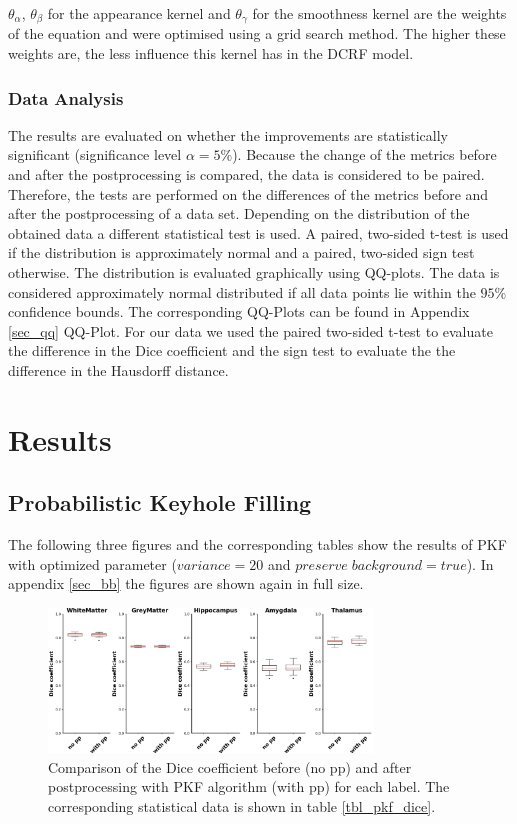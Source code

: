 \documentclass[journal]{IEEEtran}
\begin{document}
$\theta_\alpha$, $\theta_\beta$ for the appearance kernel and $\theta_\gamma$ for the smoothness kernel are the weights of the equation and were optimised using a grid search method. The higher these weights are, the less influence this kernel has in the DCRF model.
\subsubsection{Data Analysis}
The results are evaluated on whether the improvements are statistically significant (significance level $\alpha = 5\%$). Because the change of the metrics before and after the postprocessing is compared, the data is considered to be paired. Therefore, the tests are performed on the differences of the metrics before and after the postprocessing of a data set. Depending on the distribution of the obtained data a different statistical test is used. A paired, two-sided t-test is used if the distribution is approximately normal and a paired, two-sided sign test otherwise. The distribution is evaluated graphically using QQ-plots. The data is considered approximately normal distributed if all data points lie within the $95\%$ confidence bounds. The corresponding QQ-Plots can be found in Appendix \ref{sec_qq} QQ-Plot. For our data we used the paired two-sided t-test to evaluate the difference in the Dice coefficient and the sign test to evaluate the the difference in the Hausdorff distance. 
\section{Results}

\newcommand{\expnumber}[2]{{#1}\mathrm{e}{#2}}
\subsection{Probabilistic Keyhole Filling}
The following three figures and the corresponding tables show the results of PKF with optimized parameter ($variance = 20$ and $preserve\; background = true$). In appendix \ref{sec_bb} the figures are shown again in full size.


\begin{figure}[ht]
\centering

\includegraphics[width=3.4in]{img/boxplots/PKF-Dice.png}


\caption{Comparison of the Dice coefficient before (no pp) and after postprocessing with PKF algorithm (with pp) for each label. The corresponding statistical data is shown in table \ref{tbl_pkf_dice}.
} 
\label{fig_pkf_dice}
\end{figure}
\end{document}
